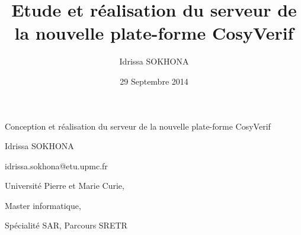 \documentclass[t, english]{beamer}
\begin{document}
\title{Etude et réalisation du serveur de la nouvelle plate-forme CosyVerif}
\author{Idrissa SOKHONA}
\date{29 Septembre 2014}

\begin{frame}
\begin{center}

\par
\Huge Conception et réalisation du serveur de la nouvelle plate-forme CosyVerif

\par
\normalsize
\textsf{Idrissa SOKHONA}

\par
\textsf{idrissa.sokhona@etu.upmc.fr}

\par
\textsf{Université Pierre et Marie Curie,}

\par
\textsf{Master informatique,}

\par
\textsf{Spécialité SAR, Parcours SRETR}

\end{center}
\end{frame}
\end{document}
